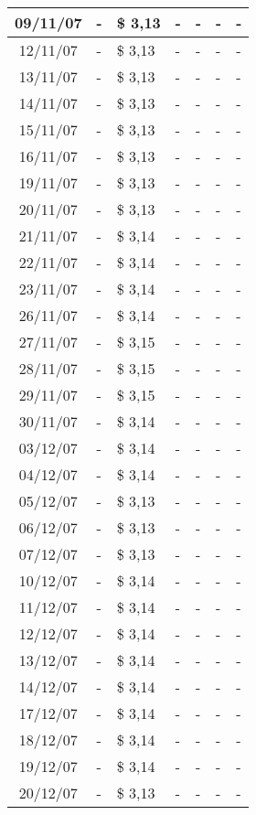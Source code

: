 \begin{center}
\begin{longtable}{|c|p{1.5cm}|p{1.5cm}|p{1.5cm}|p{1.5cm}|p{1.5cm}|p{1.5cm}|}
09/11/07 & - & \$ 3,13 & - & - & - & - \\ \hline
12/11/07 & - & \$ 3,13 & - & - & - & - \\ \hline
13/11/07 & - & \$ 3,13 & - & - & - & - \\ \hline
14/11/07 & - & \$ 3,13 & - & - & - & - \\ \hline
15/11/07 & - & \$ 3,13 & - & - & - & - \\ \hline
16/11/07 & - & \$ 3,13 & - & - & - & - \\ \hline
19/11/07 & - & \$ 3,13 & - & - & - & - \\ \hline
20/11/07 & - & \$ 3,13 & - & - & - & - \\ \hline
21/11/07 & - & \$ 3,14 & - & - & - & - \\ \hline
22/11/07 & - & \$ 3,14 & - & - & - & - \\ \hline
23/11/07 & - & \$ 3,14 & - & - & - & - \\ \hline
26/11/07 & - & \$ 3,14 & - & - & - & - \\ \hline
27/11/07 & - & \$ 3,15 & - & - & - & - \\ \hline
28/11/07 & - & \$ 3,15 & - & - & - & - \\ \hline
29/11/07 & - & \$ 3,15 & - & - & - & - \\ \hline
30/11/07 & - & \$ 3,14 & - & - & - & - \\ \hline
03/12/07 & - & \$ 3,14 & - & - & - & - \\ \hline
04/12/07 & - & \$ 3,14 & - & - & - & - \\ \hline
05/12/07 & - & \$ 3,13 & - & - & - & - \\ \hline
06/12/07 & - & \$ 3,13 & - & - & - & - \\ \hline
07/12/07 & - & \$ 3,13 & - & - & - & - \\ \hline
10/12/07 & - & \$ 3,14 & - & - & - & - \\ \hline
11/12/07 & - & \$ 3,14 & - & - & - & - \\ \hline
12/12/07 & - & \$ 3,14 & - & - & - & - \\ \hline
13/12/07 & - & \$ 3,14 & - & - & - & - \\ \hline
14/12/07 & - & \$ 3,14 & - & - & - & - \\ \hline
17/12/07 & - & \$ 3,14 & - & - & - & - \\ \hline
18/12/07 & - & \$ 3,14 & - & - & - & - \\ \hline
19/12/07 & - & \$ 3,14 & - & - & - & - \\ \hline
20/12/07 & - & \$ 3,13 & - & - & - & - \\ \hline

\end{longtable}
\end{center}
